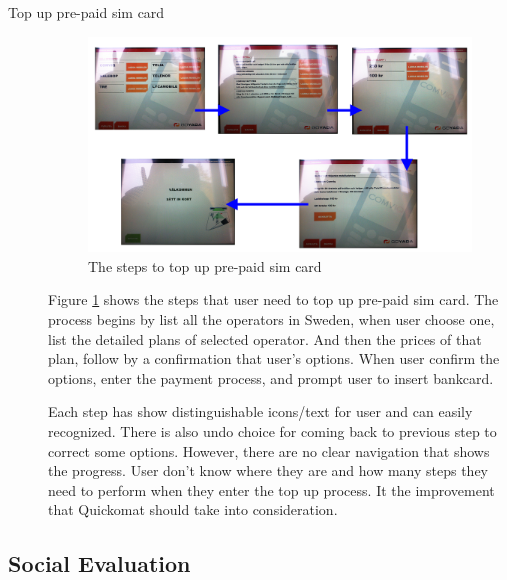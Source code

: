 \documentclass[twocolumn]{article}
\begin{document}
\begin{description}
  \item[Top up pre-paid sim card]
    \begin{figure}
      \centering
      \includegraphics[width=.8\textwidth]{fig/top-up-prepaid-sim-card.png}
      \caption{The steps to top up pre-paid sim card}
      \label{fig:top-up-prepaid-sim-card}
    \end{figure}
    Figure \ref{fig:top-up-prepaid-sim-card} shows the steps that user need to top up pre-paid sim card. The process begins by list all the operators in Sweden, when user choose one, list the detailed plans of selected operator. And then the prices of that plan, follow by a confirmation that user’s options. When user confirm the options, enter the payment process, and prompt user to insert bankcard.

    Each step has show distinguishable icons/text for user and can easily recognized. There is also undo choice for coming back to previous step to correct some options. However, there are no clear navigation that shows the progress. User don’t know where they are and how many steps they need to perform when they enter the top up process. It the improvement that Quickomat should take into consideration.
\end{description}

\subsection{Social Evaluation}
\end{document}
